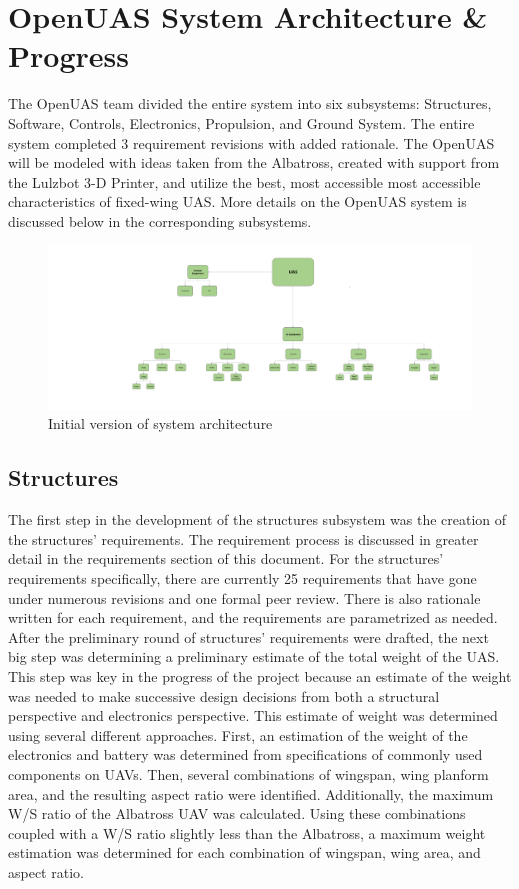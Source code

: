 ﻿\documentclass{article}
\begin{document}
\section{OpenUAS System Architecture \& Progress}
\noindent The OpenUAS team divided the entire system into six subsystems: Structures, Software, Controls, Electronics, Propulsion, and Ground System. The entire system completed 3 requirement revisions with added rationale. The OpenUAS will be modeled with ideas taken from the Albatross, created with support from the Lulzbot 3-D Printer, and utilize the best, most accessible most accessible characteristics of fixed-wing UAS. More details on the OpenUAS system is discussed below in the corresponding subsystems. \\

\begin{figure}
\includegraphics{UAS_Subsystems.pdf}
\caption{Initial version of system architecture}
\centering
\end{figure}

\subsection{Structures}
\noindent The first step in the development of the structures subsystem was the creation of the structures' requirements. The requirement process is discussed in greater detail in the requirements section of this document. For the structures' requirements specifically, there are currently 25 requirements that have gone under numerous revisions and one formal peer review. There is also rationale written for each requirement, and the requirements are parametrized as needed. \\

\noindent After the preliminary round of structures' requirements were drafted, the next big step was determining a preliminary estimate of the total weight of the UAS. This step was key in the progress of the project because an estimate of the weight was needed to make successive design decisions from both a structural perspective and electronics perspective. This estimate of weight was determined using several different approaches. First, an estimation of the weight of the electronics and battery was determined from specifications of commonly used components on UAVs. Then, several combinations of wingspan, wing planform area, and the resulting aspect ratio were identified. Additionally, the maximum W/S ratio of the Albatross UAV was calculated. Using these combinations coupled with a W/S ratio slightly less than the Albatross, a maximum weight estimation was determined for each combination of wingspan, wing area, and aspect ratio.\\
\end{document}

